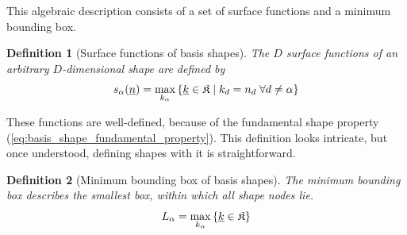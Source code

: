 \documentclass{article}
\newtheorem{definition}{Definition}
\begin{document}
This algebraic description consists of a set of surface functions and
a minimum bounding box.

\begin{definition}[Surface functions of basis shapes]
  The \(D\) surface functions of an arbitrary \(D\)-dimensional shape are defined by
  \begin{equation}
  s_{\alpha}(\underline{n})=\max_{k_{\alpha}}
    \left\{\underline{k} \in \mathfrak{K} \;|\;
      k_d = n_d \; \forall d \neq \alpha
    \right\}
    \label{eq:basis_shape_surface_function}
  \end{equation}
\end{definition}

These functions are well-defined, because of the fundamental shape property
(\ref{eq:basis_shape_fundamental_property}).
This definition looks intricate, but once understood, defining shapes with it
is straightforward.

\begin{definition}[Minimum bounding box of basis shapes]
  The minimum bounding box describes the smallest
  box, within which all shape nodes lie.
  \begin{equation}
    L_{\alpha}=\max_{k_{\alpha}}\left\{\underline{k} \in \mathfrak{K}\right\}
    \label{eq:basis_shape_bbox}
  \end{equation}
\end{definition}
\end{document}
